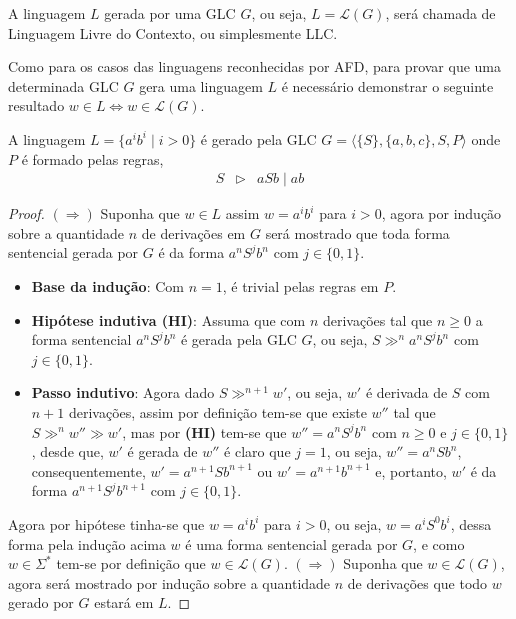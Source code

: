 \begin{definition}\label{def:LLC}
	A linguagem $L$ gerada por uma GLC $G$, ou seja, $L = \mathcal{L}(G)$, será chamada de Linguagem Livre do Contexto, ou simplesmente LLC.
\end{definition}

Como para os casos das linguagens reconhecidas por AFD, para provar que uma determinada GLC $G$ gera uma linguagem $L$ é necessário demonstrar o seguinte resultado $w \in L \Longleftrightarrow w \in \mathcal{L}(G)$.

\begin{exem}\label{exe:LinguagemGLC}
	A linguagem $L = \{a^ib^i \mid i  > 0\}$ é gerado pela GLC $G = \langle \{S\}, \{a,b,c\}, S, P\rangle$ onde $P$ é formado pelas regras,
	\begin{eqnarray*}
		S & \rhd & aSb \mid ab
	\end{eqnarray*}
	\begin{proof}
		$(\Rightarrow)$ Suponha que $w \in L$ assim $w = a^ib^i$ para $i  > 0$, agora por indução sobre a quantidade $n$ de derivações em $G$ será mostrado que toda forma sentencial gerada por $G$ é da forma $a^nS^jb^n$ com $j \in \{0, 1\}$. 
		\begin{itemize}
			\item[ ] \textbf{Base da indução}: Com $n = 1$, é trivial pelas regras em $P$. 
			\item[ ] \textbf{Hipótese indutiva (HI)}: Assuma que com $n$ derivações tal que $n \geq 0$ a forma sentencial $a^nS^jb^n$ é gerada pela GLC $G$, ou seja, $S \gg^n a^nS^jb^n$ com $j \in \{0, 1\}$. 
			\item[ ] \textbf{Passo indutivo}: Agora dado $S \gg^{n+1} w'$, ou seja, $w'$ é derivada de $S$ com $n+1$ derivações, assim por definição tem-se que existe $w''$ tal que $S \gg^n w'' \gg w'$, mas por \textbf{(HI)} tem-se que $w'' =  a^nS^jb^n$ com $n \geq 0$ e $j \in \{0, 1\}$,  desde que, $w'$ é gerada de $w''$ é claro que $j = 1$, ou seja, $w'' = a^nSb^n$, consequentemente, $w' = a^{n+1}Sb^{n+1}$ ou $w' = a^{n+1}b^{n+1}$ e, portanto, $w'$ é da forma $a^{n+1}S^jb^{n+1}$ com $j \in \{0, 1\}$. 
		\end{itemize}
		Agora por hipótese tinha-se que $w = a^ib^i$ para $i  > 0$, ou seja, $w = a^iS^0b^i$, dessa forma pela indução acima $w$ é uma forma sentencial gerada por $G$, e como $w \in \Sigma^*$ tem-se por definição que $w \in \mathcal{L}(G)$. $(\Rightarrow)$ Suponha que $w \in \mathcal{L}(G)$, agora será mostrado por indução sobre a quantidade $n$ de derivações que todo $w$ gerado por $G$ estará em $L$.

\end{proof}
\end{exem}
